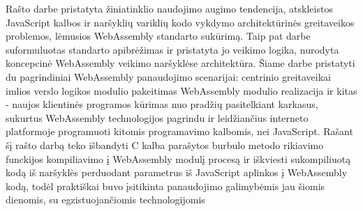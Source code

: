 \documentclass{VUMIFPSkursinis}
\begin{document}
Rašto darbe pristatyta žiniatinklio naudojimo augimo tendencija, atskleistos JavaScript kalbos ir naršyklių variklių kodo vykdymo architektūrinės greitaveikos problemos, lėmusios WebAssembly standarto sukūrimą. Taip pat darbe suformuluotas standarto apibrėžimas ir pristatyta jo veikimo logika, nurodyta koncepcinė WebAssembly veikimo naršyklėse architektūra. Šiame darbe pristatyti du pagrindiniai WebAssembly panaudojimo scenarijai: centrinio greitaveikai imlios verslo logikos modulio pakeitimas WebAssembly modulio realizacija ir kitas - naujos klientinės programos kūrimas nuo pradžių pasitelkiant karkasus, sukurtus WebAssembly technologijos pagrindu ir leidžiančius interneto platformoje programuoti kitomis programavimo kalbomis, nei JavaScript. Rašant šį rašto darbą teko išbandyti C kalba parašytos burbulo metodo rikiavimo funckijos kompiliavimo į WebAssembly modulį procesą ir iškviesti sukompiliuotą kodą iš naršyklės perduodant parametrus iš JavaScript aplinkos  į WebAssembly kodą, todėl praktiškai buvo įsitikinta panaudojimo galimybėmis jau šiomis dienomis, su egzistuojančiomis technologijomis
\end{document}
